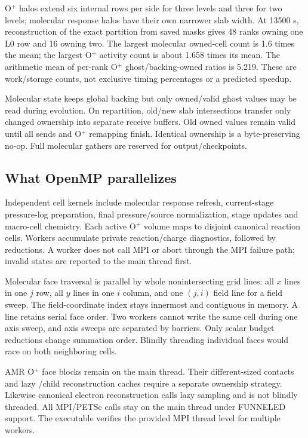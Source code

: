 O$^+$ halos extend six internal rows per side for three levels and three
for two levels; molecular response halos have their own narrower slab
width. At 13500 s, reconstruction of the exact partition from saved masks
gives 48 ranks owning one L0 row and 16 owning two. The largest molecular
owned-cell count is 1.6 times the mean; the largest O$^+$ activity count is
about 1.658 times its mean. The arithmetic mean of per-rank O$^+$
ghost/backing-owned ratios is 5.219. These are work/storage counts, not
exclusive timing percentages or a predicted speedup.

Molecular state keeps global backing but only owned/valid ghost values may
be read during evolution. On repartition, old/new slab intersections
transfer only changed ownership into separate receive buffers. Old owned
values remain valid until all sends and O$^+$ remapping finish. Identical
ownership is a byte-preserving no-op. Full molecular gathers are reserved
for output/checkpoints.

\subsection{What OpenMP parallelizes}
Independent cell kernels include molecular response refresh, current-stage
pressure-log preparation, final pressure/source normalization, stage
updates and macro-cell chemistry. Each active O$^+$ volume maps to disjoint
canonical reaction cells. Workers accumulate private reaction/charge
diagnostics, followed by reductions. A worker does not call MPI or abort
through the MPI failure path; invalid states are reported to the main
thread first.

Molecular face traversal is parallel by whole nonintersecting grid lines:
all $x$ lines in one $j$ row, all $y$ lines in one $i$ column, and one $(j,i)$ field line for a field sweep. The field-coordinate index stays innermost and contiguous in memory. A line retains serial face order. Two workers cannot write the same
cell during one axis sweep, and axis sweeps are separated by barriers.
Only scalar budget reductions change summation order. Blindly threading
individual faces would race on both neighboring cells.

AMR O$^+$ face blocks remain on the main thread. Their different-sized
contacts and lazy /child reconstruction caches require a
separate ownership strategy. Likewise canonical electron reconstruction
calls lazy sampling and is not blindly threaded. All MPI/PETSc calls stay
on the main thread under FUNNELED support. The executable verifies the
provided MPI thread level for multiple workers.


